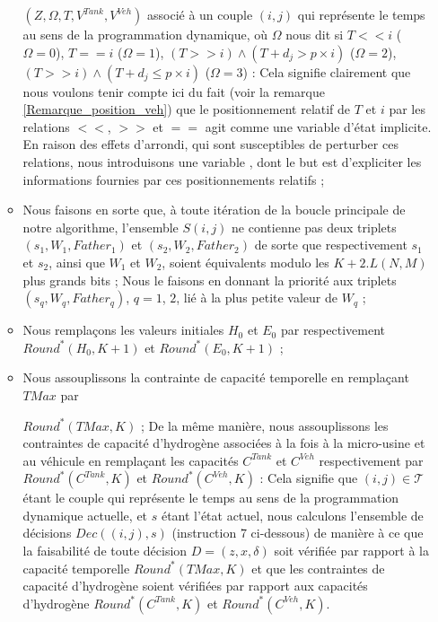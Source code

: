 \begin{enumerate}
\begin{itemize}[label=$\square$]
		$(Z,\Omega, T,V^{Tank}, V^{Veh})$ associé à un couple $(i,j)$ qui représente le temps au sens de la programmation dynamique, où $\Omega$ nous dit si $T<<i$ ($\Omega=0$), $T==i$ ($\Omega=1$), $(T>>i)\land(T+d_j>p \times i)$ ($\Omega=2$), $(T>>i)\land(T+d_j\leq p \times i)$ ($\Omega=3$) : Cela signifie clairement que nous voulons tenir compte ici du fait (voir la remarque \ref{Remarque_position_veh}) que le positionnement relatif de $T$ et $i$ par les relations $<<$, $>>$ et $==$ agit comme une variable d'état implicite. En raison des effets d'arrondi, qui sont susceptibles de perturber ces relations, nous introduisons une variable , dont le but est d'expliciter les informations fournies par ces positionnements relatifs ; 
		\item Nous faisons en sorte que, à toute itération de la boucle principale de notre algorithme, l'ensemble $S(i, j)$ ne contienne pas deux triplets $(s_1, W_1, Father_1)$ et $(s_2, W_2, Father_2)$ de sorte que respectivement $s_1$ et $s_2$, ainsi que $W_1$ et $W_2$, soient équivalents modulo les $K + 2.L(N, M)$ plus grands bits ; Nous le faisons en donnant la priorité aux triplets $(s_q, W_q, Father_q)$, $q = 1$, $2$, lié à la plus petite valeur de $W_q$ ;
		\item Nous remplaçons les valeurs initiales $H_0$ et $E_0$ par respectivement $Round^*(H_0, K + 1)$ et $Round^*(E_0, K + 1)$ ; 
		\item Nous assouplissons la contrainte de capacité temporelle en remplaçant $TMax$ par 
		
		$Round^*(TMax, K)$ ; De la même manière, nous assouplissons les contraintes de capacité d'hydrogène associées à la fois à la micro-usine et au véhicule en remplaçant les capacités $C^{Tank}$ et $C^{Veh}$ respectivement par $Round^*(C^{Tank}, K)$ et $Round^*(C^{Veh}, K)$ : Cela signifie que $(i, j) \in \mathcal{T}$ étant le couple qui représente le temps au sens de la programmation dynamique actuelle, et $s$ étant l'état actuel, nous calculons l'ensemble de décisions $Dec((i, j), s)$ (instruction 7 ci-dessous) de manière à ce que la faisabilité de toute décision $D = (z, x, \delta)$ soit vérifiée par rapport à la capacité temporelle $Round^*(TMax, K)$ et que les contraintes de capacité d'hydrogène soient vérifiées par rapport aux capacités d'hydrogène $Round^*(C^{Tank}, K)$ et $Round^*(C^{Veh}, K)$. 
	\end{itemize}
\end{enumerate}

